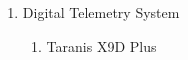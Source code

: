 \documentclass{article}
\begin{document}
\begin{enumerate}
\item Digital Telemetry System\\

\begin{enumerate}
\item Taranis X9D Plus\\
\end{enumerate}

\end{enumerate}
\end{document}
